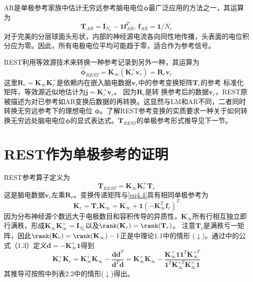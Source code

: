 AR是单极参考家族中估计无穷远参考脑电电位$\mathbf{\phi}$最广泛应用的方法之一，其运算为
\begin{equation}\label{eq4.5}
\mathbf{T}_{AR}=\mathbf{I}_{N_c}-\mathbf{1f}_{AR}^T,\,\mathbf{f}_{AR}=\mathbf{1}/{N_c}
\end{equation}
对于完美的分层球面头形状，内部的神经源电流各向同性地传播，头表面的电位积分应为零。因此，所有电极电位平均可能趋于零，适合作为参考信号。

REST利用等效源技术来转换一种参考记录到另外一种，其运算为
\begin{equation}\label{eq4.6}
\hat{\mathbf{\phi}}_{REST}=\mathbf{K}_{\infty}(\mathbf{K}_r^+\mathbf{v}_r)=\mathbf{R}_r\mathbf{v}_r
\end{equation}
这里$\mathbf{R}_r=\mathbf{K}_{\infty}\mathbf{K}_r^+$是依赖内在嵌入脑电数据$\mathbf{v}_r$中的参考变换矩阵$\mathbf{T}_r$的参考
标准化矩阵，等效源近似地估计为$\hat{\mathbf{j}}=\mathbf{K}_r^+\mathbf{v}_r$。 因为$\mathbf{R}_r$是转
换参考后的数据$\mathbf{v}_r$，REST原被描述为对已参考如AR变换后数据的再转换。这显然与LM和AR不同，二者同时转换无穷远参考下的理想电位
$\mathbf{\phi}$。了解REST参考变换的实质要求一种关于如何转换无穷远处脑电电位$\mathbf{\phi}$的显式表达式。$\mathbf{T}_{REST}$的单极参考形式推导见下一节。

\section{REST作为单极参考的证明}\label{4:RESTasUR}
REST参考算子定义为
\begin{equation}\label{eq4.7}
\mathbf{T}_{REST}=\mathbf{K}_{\infty}\mathbf{K}_r^+\mathbf{T}_r
\end{equation}
这是脑电数据$\mathbf{v}_r$左乘$\mathbf{R}_r$。变换传递矩阵与\eqref{eq4.4}具有相同单极参考为
\begin{equation}\label{eq4.8}
\mathbf{K}_{r}=\mathbf{T}_r\mathbf{K}_{\infty}=\mathbf{K}_{\infty}+\mathbf{1}(\mathbf{-K}_{\infty}^T\mathbf{f}_r)^T
\end{equation}
因为分布神经源个数远大于电极数目和容积传导的异质性，$\mathbf{K}_{\infty}$所有行相互独立即行满秩，形成$\mathbf{K}_{\infty}\mathbf{K}_{\infty}^+=\mathbf{I}_{N_c}$以及$\rank(\mathbf{K}_r)=\rank(\mathbf{T}_r)$。 注意$\mathbf{T}_r$是满秩亏一矩阵，因此$\rank(\mathbf{K}_r)=\rank(\mathbf{K}_{\infty})-1$正是\cite{baksalary_revisitation_2003}中理论1.1中的情形 ($\downarrow$)。通过\cite{baksalary_revisitation_2003}中的公式（1.3）定义$\mathbf{d}=-\mathbf{K}_{\infty}^+\mathbf{1}$得到
\begin{equation}\label{eq4.9}
\mathbf{K}_{r}^+\mathbf{K}_{r}=\mathbf{K}_{\infty}^+\mathbf{K}_{\infty}-\frac{\mathbf{dd}^T}{{\mathbf{d}^T\mathbf{d}}}=\mathbf{K}_{\infty}^+\mathbf{K}_{\infty}-\frac{\mathbf{K}_{\infty}^+\mathbf{11}^T\mathbf{K}_{\infty}^{+T}}{{\mathbf{1}^T\mathbf{K}_{\infty}^{+T}\mathbf{K}_{\infty}^+\mathbf{1}}}
\end{equation}
其推导可按照\cite{baksalary_revisitation_2003}中列表2.2中的情形($\downarrow$)得出。

